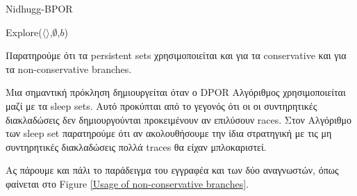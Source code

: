 \begin{algorithm}
    \caption{Nidhugg-BPOR}
    \label{Nidhugg BPOR}
    Explore($\langle \rangle$,$\emptyset$,$b$)\;
\end{algorithm}

Παρατηρούμε ότι τα persistent sets χρησιμοποιείται και για τα conservative και για τα non-conservative branches.

Μια σημαντική πρόκληση δημιουργείται όταν ο DPOR Αλγόριθμος χρησιμοποιείται μαζί με τα sleep sets. Αυτό προκύπται από το γεγονός ότι οι 
οι συντηρητικές διακλαδώσεις δεν δημιουργούνται προκειμένουν αν επιλύσουν races. Στον Αλγόριθμο των sleep set παρατηρούμε ότι αν ακολουθήσουμε 
την ίδια στρατηγική με τις μη συντηρητικές διακλαδώσεις πολλά traces θα είχαν μπλοκαριστεί.

Ας πάρουμε και πάλι το παράδειγμα του εγγραφέα και των δύο αναγνωστών, όπως φαίνεται στο Figure \ref{Usage of non-conservative branches}.

